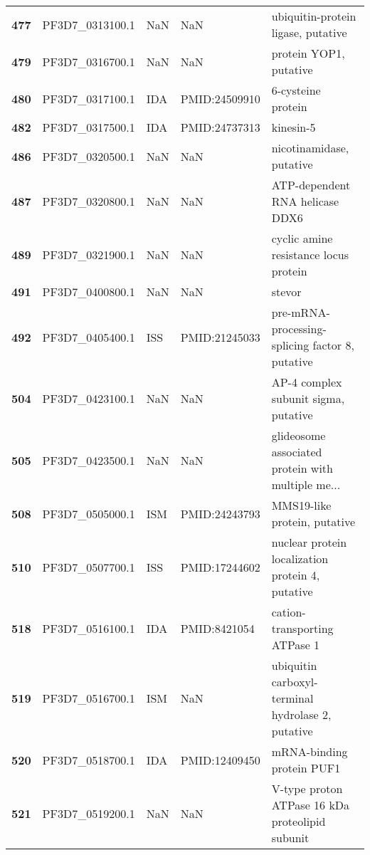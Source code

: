 \begin{longtable}{lllll}
\textbf{477} &  PF3D7\_0313100.1 &      NaN &            NaN &                 ubiquitin-protein ligase, putative \\
\textbf{479} &  PF3D7\_0316700.1 &      NaN &            NaN &                             protein YOP1, putative \\
\textbf{480} &  PF3D7\_0317100.1 &      IDA &  PMID:24509910 &                                 6-cysteine protein \\
\textbf{482} &  PF3D7\_0317500.1 &      IDA &  PMID:24737313 &                                          kinesin-5 \\
\textbf{486} &  PF3D7\_0320500.1 &      NaN &            NaN &                           nicotinamidase, putative \\
\textbf{487} &  PF3D7\_0320800.1 &      NaN &            NaN &                    ATP-dependent RNA helicase DDX6 \\
\textbf{489} &  PF3D7\_0321900.1 &      NaN &            NaN &              cyclic amine resistance locus protein \\
\textbf{491} &  PF3D7\_0400800.1 &      NaN &            NaN &                                             stevor \\
\textbf{492} &  PF3D7\_0405400.1 &      ISS &  PMID:21245033 &    pre-mRNA-processing-splicing factor 8, putative \\
\textbf{504} &  PF3D7\_0423100.1 &      NaN &            NaN &               AP-4 complex subunit sigma, putative \\
\textbf{505} &  PF3D7\_0423500.1 &      NaN &            NaN &  glideosome associated protein with multiple me... \\
\textbf{508} &  PF3D7\_0505000.1 &      ISM &  PMID:24243793 &                       MMS19-like protein, putative \\
\textbf{510} &  PF3D7\_0507700.1 &      ISS &  PMID:17244602 &   nuclear protein localization protein 4, putative \\
\textbf{518} &  PF3D7\_0516100.1 &      IDA &   PMID:8421054 &                       cation-transporting ATPase 1 \\
\textbf{519} &  PF3D7\_0516700.1 &      ISM &            NaN &  ubiquitin carboxyl-terminal hydrolase 2, putative \\
\textbf{520} &  PF3D7\_0518700.1 &      IDA &  PMID:12409450 &                          mRNA-binding protein PUF1 \\
\textbf{521} &  PF3D7\_0519200.1 &      NaN &            NaN &    V-type proton ATPase 16 kDa proteolipid subunit \\

\end{longtable}
